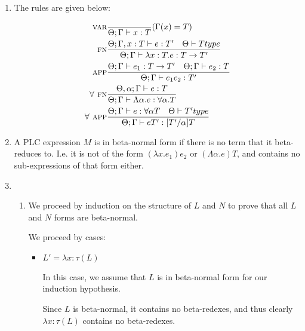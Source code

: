 


\begin{enumerate}[label=(\alph*)]
  \item
  The rules are given below:

  \begin{align*}
    \textsc{var}&\frac{}{\Theta;\Gamma \vdash x : T}(\Gamma(x) = T) \\
    \textsc{fn}&\frac{\Theta;\Gamma, x : T \vdash e : T' \hspace{10pt} \Theta \vdash T type}{\Theta;\Gamma \vdash \lambda x:T. e : T \rightarrow T'}\\
    \textsc{app}&\frac{\Theta;\Gamma \vdash e_1 : T \rightarrow T' \hspace{10pt} \Theta;\Gamma \vdash e_2 : T}{\Theta;\Gamma \vdash e_1 e_2 : T'}\\
    \textsc{$\forall$ fn}&\frac{\Theta,\alpha;\Gamma \vdash e : T}{\Theta;\Gamma \vdash \Lambda \alpha. e : \forall \alpha. T}\\
    \textsc{$\forall$ app}&\frac{\Theta;\Gamma \vdash e : \forall \alpha T \hspace{10pt}\Theta \vdash T' type}{\Theta;\Gamma \vdash e T' : [T' / \alpha]T}\\
  \end{align*}

\item

  A PLC expression $M$ is in beta-normal form if there is no term that it beta-reduces to. I.e. it is not of the form $(\lambda x. e_1) e_2$ or $(\Lambda \alpha. e) T$, and contains no sub-expressions of that form either.

\item
  \begin{enumerate}[label=(\roman*)]
    \item
      We proceed by induction on the structure of $L$ and $N$ to prove that all $L$ and $N$ forms are beta-normal.

      We proceed by cases:

      \begin{itemize}
        \item
          $L' = \lambda x : \tau(L)$

          In this case, we assume that $L$ is in beta-normal form for our induction hypothesis.

          Since $L$ is beta-normal, it contains no beta-redexes, and thus clearly $\lambda x:\tau(L)$ contains no beta-redexes.


\end{itemize}
\end{enumerate}
\end{enumerate}

